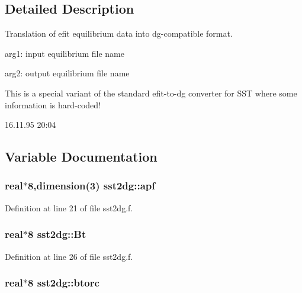 \subsection{Detailed Description}
Translation of efit equilibrium data into dg-compatible format. 

arg1: input equilibrium file name

arg2: output equilibrium file name

This is a special variant of the standard efit-to-dg converter for SST where some information is hard-coded!

\begin{Desc}
\item[Version:]16.11.95 20:04 \end{Desc}


\subsection{Variable Documentation}
\hypertarget{namespacesst2dg_3acca40cb9b97fe216f3f11dd3c7b4da}{
\subsubsection[apf]{\setlength{\rightskip}{0pt plus 5cm}real$\ast$8,dimension(3) {\bf sst2dg::apf}}}
\label{namespacesst2dg_3acca40cb9b97fe216f3f11dd3c7b4da}




Definition at line 21 of file sst2dg.f.\hypertarget{namespacesst2dg_8213ddbfdc0dce0dd4119c3c22c626ac}{
\subsubsection[Bt]{\setlength{\rightskip}{0pt plus 5cm}real$\ast$8 {\bf sst2dg::Bt}}}
\label{namespacesst2dg_8213ddbfdc0dce0dd4119c3c22c626ac}




Definition at line 26 of file sst2dg.f.\hypertarget{namespacesst2dg_9aff60cf58711338aef804123dca3cd5}{
\subsubsection[btorc]{\setlength{\rightskip}{0pt plus 5cm}real$\ast$8 {\bf sst2dg::btorc}}}
\label{namespacesst2dg_9aff60cf58711338aef804123dca3cd5}




